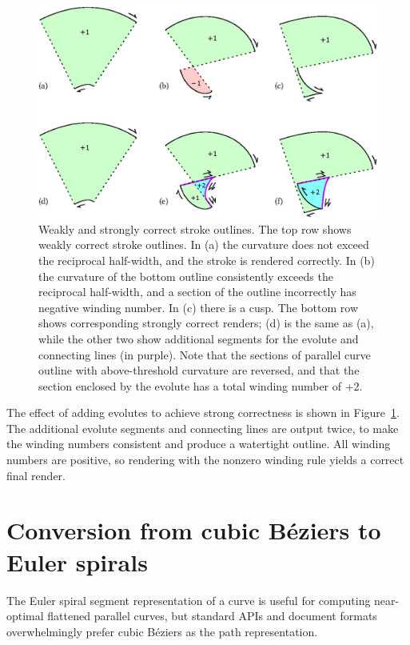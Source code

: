 \documentclass[sigconf, nonacm]{acmart}
\begin{document}
\begin{figure}
    \includegraphics[scale=0.6]{evolute_fig}
    \caption{Weakly and strongly correct stroke outlines. The top row shows weakly correct stroke outlines. In (a) the curvature does not exceed the reciprocal half-width, and the stroke is rendered correctly. In (b) the curvature of the bottom outline consistently exceeds the reciprocal half-width, and a section of the outline incorrectly has negative winding number. In (c) there is a cusp. The bottom row shows corresponding strongly correct renders; (d) is the same as (a), while the other two show additional segments for the evolute and connecting lines (in purple). Note that the sections of parallel curve outline with above-threshold curvature are reversed, and that the section enclosed by the evolute has a total winding number of +2.}
    \label{fig:evolutes}
\end{figure}

The effect of adding evolutes to achieve strong correctness is shown in Figure~\ref{fig:evolutes}. The additional evolute segments and connecting lines are output twice, to make the winding numbers consistent and produce a watertight outline. All winding numbers are positive, so rendering with the nonzero winding rule yields a correct final render.

\section{Conversion from cubic Béziers to Euler spirals}

The Euler spiral segment representation of a curve is useful for computing near-optimal flattened parallel curves, but standard APIs and document formats overwhelmingly prefer cubic Béziers as the path representation.
\end{document}
